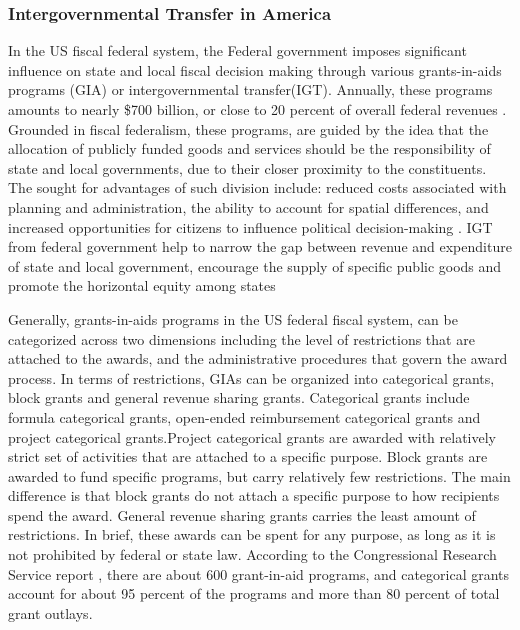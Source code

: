 \subsubsection{Intergovernmental Transfer in America}
In the US fiscal federal system, the Federal government imposes significant influence on state and local fiscal decision making through various grants-in-aids programs (GIA) or intergovernmental transfer(IGT). Annually, these programs amounts to nearly \$700 billion, or close to 20 percent of overall federal revenues \cite{dilger2015federal}. Grounded in fiscal federalism, these programs, are guided by the idea that the allocation of publicly funded goods and services should be the responsibility of state and local governments, due to their closer proximity to the constituents. The sought for advantages of such division include: reduced costs associated with planning and administration, the ability to account for spatial differences, and increased opportunities for citizens to influence political decision-making \cite{musgrave1997devolution}. IGT from federal government help to narrow the gap between revenue and expenditure of state and local government, encourage the supply of specific public goods and promote the horizontal equity among states

Generally, grants-in-aids programs in the US federal fiscal system, can be categorized across two dimensions including the level of restrictions that are attached to the awards, and the administrative procedures that govern the award process. In terms of restrictions, GIAs can be organized into categorical grants, block grants and general revenue sharing grants. Categorical grants include formula categorical grants, open-ended reimbursement categorical grants and project categorical grants.Project categorical grants are awarded with relatively strict set of activities that are attached to a specific purpose. Block grants are awarded to fund specific programs, but carry relatively few restrictions. The main difference is that block grants do not attach a specific purpose to how recipients spend the award. General revenue sharing grants carries the least amount of restrictions. In brief, these awards can be spent for any purpose, as long as it is not prohibited by federal or state law.  According to the Congressional Research Service report \cite{dilger2015federal}, there are about 600 grant-in-aid programs, and categorical grants account for about 95 percent of the programs and more than 80 percent of total grant outlays.

